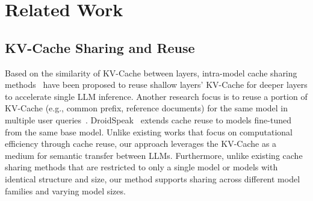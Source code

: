 \section{Related Work}
\label{sec:related_work}

\subsection{KV-Cache Sharing and Reuse}
Based on the similarity of KV-Cache between layers, intra-model cache sharing methods~\citep{yang2024kvsharer, wu2024layer, sun2024you, brandon2024reducing, wu2025systematic} have been proposed to reuse shallow layers' KV-Cache for deeper layers to accelerate single LLM inference. 
Another research focus is to reuse a portion of KV-Cache (e.g., common prefix, reference documents) for the same model in multiple user queries~\citep{bang2023gptcache, ye2024chunkattention, yao2024cacheblend, qin2024mooncake, yang2025kvlink, ye2025kvcomm, eyuboglu2025cartridges}.
DroidSpeak~\citep{liu2024droidspeak} extends cache reuse to models fine-tuned from the same base model. 
Unlike existing works that focus on computational efficiency through cache reuse, our approach leverages the KV-Cache as a medium for semantic transfer between LLMs.
Furthermore, unlike existing cache sharing methods that are restricted to only a single model or models with identical structure and size, our method supports sharing across different model families and varying model sizes. 

